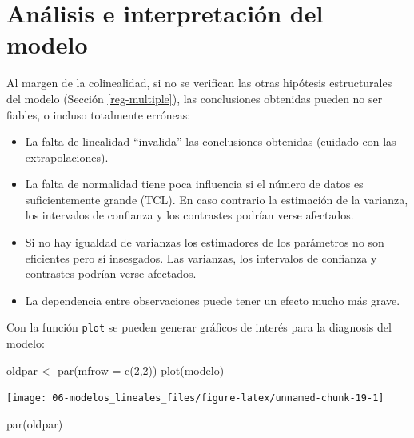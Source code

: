 \documentclass[
  spanish,
]{book}
\newenvironment{Shaded}{\begin{snugshade}}{\end{snugshade}}
\newcommand{\AttributeTok}[1]{\textcolor[rgb]{0.77,0.63,0.00}{#1}}
\newcommand{\DecValTok}[1]{\textcolor[rgb]{0.00,0.00,0.81}{#1}}
\newcommand{\FunctionTok}[1]{\textcolor[rgb]{0.00,0.00,0.00}{#1}}
\newcommand{\NormalTok}[1]{#1}
\newcommand{\OtherTok}[1]{\textcolor[rgb]{0.56,0.35,0.01}{#1}}
\theoremstyle{break}
\theoremstyle{definition}
\theoremstyle{definition}
\theoremstyle{definition}
\theoremstyle{definition}
\theoremstyle{remark}
\begin{document}
\hypertarget{analisis-reg-multiple}{%
\section{Análisis e interpretación del modelo}\label{analisis-reg-multiple}}

Al margen de la colinealidad, si no se verifican las otras hipótesis estructurales del modelo (Sección \ref{reg-multiple}), las conclusiones obtenidas pueden no ser fiables, o incluso totalmente erróneas:

\begin{itemize}
\item
  La falta de linealidad ``invalida'' las conclusiones obtenidas
  (cuidado con las extrapolaciones).
\item
  La falta de normalidad tiene poca influencia si el
  número de datos es suficientemente grande (TCL). En caso contrario
  la estimación de la varianza, los intervalos de confianza y los
  contrastes podrían verse afectados.
\item
  Si no hay igualdad de varianzas los estimadores de los
  parámetros no son eficientes pero sí insesgados. Las varianzas, los
  intervalos de confianza y contrastes podrían verse afectados.
\item
  La dependencia entre observaciones puede tener un efecto mucho
  más grave.
\end{itemize}

Con la función \texttt{plot} se pueden generar gráficos de interés para la diagnosis del modelo:

\begin{Shaded}
\begin{Highlighting}[]
\NormalTok{oldpar }\OtherTok{\textless{}{-}} \FunctionTok{par}\NormalTok{(}\AttributeTok{mfrow =} \FunctionTok{c}\NormalTok{(}\DecValTok{2}\NormalTok{,}\DecValTok{2}\NormalTok{))}
\FunctionTok{plot}\NormalTok{(modelo)}
\end{Highlighting}
\end{Shaded}

\begin{center}\texttt{[image: 06-modelos\_lineales\_files/figure-latex/unnamed-chunk-19-1]} \end{center}

\begin{Shaded}
\begin{Highlighting}[]
\FunctionTok{par}\NormalTok{(oldpar)}
\end{Highlighting}
\end{Shaded}
\end{document}
